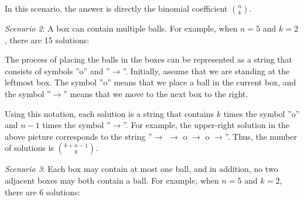 In this scenario, the answer is directly the
binomial coefficient ${n \choose k}$.

\textit{Scenario 2}: A box can contain multiple balls.
For example, when $n=5$ and $k=2$,
there are 15 solutions:

\begin{center}
\end{center}

The process of placing the balls in the boxes
can be represented as a string
that consists of symbols
''o'' and ''$\rightarrow$''.
Initially, assume that we are standing at the leftmost box.
The symbol ''o'' means that we place a ball
in the current box, and the symbol
''$\rightarrow$'' means that we move to
the next box to the right.

Using this notation, each solution is a string
that contains $k$ times the symbol ''o'' and
$n-1$ times the symbol ''$\rightarrow$''.
For example, the upper-right solution
in the above picture corresponds to the string
''$\rightarrow$ $\rightarrow$ o $\rightarrow$ o $\rightarrow$''.
Thus, the number of solutions is
${k+n-1 \choose k}$.

\textit{Scenario 3}: Each box may contain at most one ball,
and in addition, no two adjacent boxes may both contain a ball.
For example, when $n=5$ and $k=2$,
there are 6 solutions:


